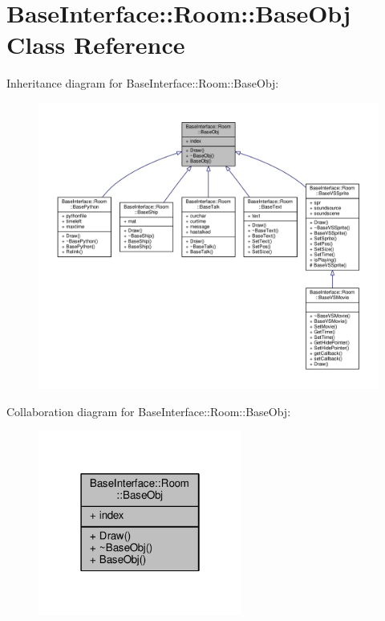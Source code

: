 \hypertarget{classBaseInterface_1_1Room_1_1BaseObj}{}\section{Base\+Interface\+:\+:Room\+:\+:Base\+Obj Class Reference}
\label{classBaseInterface_1_1Room_1_1BaseObj}


Inheritance diagram for Base\+Interface\+:\+:Room\+:\+:Base\+Obj\+:
\nopagebreak
\begin{figure}[H]
\begin{center}
\leavevmode
\includegraphics[width=350pt]{dd/d59/classBaseInterface_1_1Room_1_1BaseObj__inherit__graph}
\end{center}
\end{figure}


Collaboration diagram for Base\+Interface\+:\+:Room\+:\+:Base\+Obj\+:
\nopagebreak
\begin{figure}[H]
\begin{center}
\leavevmode
\includegraphics[width=190pt]{d4/dd9/classBaseInterface_1_1Room_1_1BaseObj__coll__graph}
\end{center}
\end{figure}
